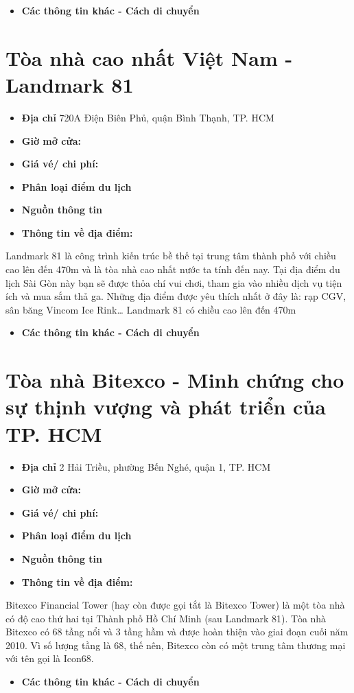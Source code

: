 \documentclass{article}
\begin{document}
\begin{itemize}
    \item{\textbf{Các thông tin khác - Cách di chuyển}}
\end{itemize}

\section{Tòa nhà cao nhất Việt Nam - Landmark 81}
\begin{itemize}
    \item{\textbf{Địa chỉ}} 720A Điện Biên Phủ, quận Bình Thạnh, TP. HCM
    \item{\textbf{Giờ mở cửa:}}
    \item{\textbf{Giá vé/ chi phí:}}
    \item{\textbf{Phân loại điểm du lịch} }
    \item{\textbf{Nguồn thông tin}}
    \item{\textbf{Thông tin về địa điểm:}}
\end{itemize}
Landmark 81 là công trình kiến trúc bề thế tại trung tâm thành phố với chiều cao lên đến 470m và là tòa nhà cao nhất nước ta tính đến nay. Tại địa điểm du lịch Sài Gòn này bạn sẽ được thỏa chí vui chơi, tham gia vào nhiều dịch vụ tiện ích và mua sắm thả ga. Những địa điểm được yêu thích nhất ở đây là: rạp CGV, sân băng Vincom Ice Rink… Landmark 81 có chiều cao lên đến 470m
\begin{itemize}
    \item{\textbf{Các thông tin khác - Cách di chuyển}}
\end{itemize}

\section{Tòa nhà Bitexco - Minh chứng cho sự thịnh vượng và phát triển của TP. HCM}
\begin{itemize}
    \item{\textbf{Địa chỉ}} 2 Hải Triều, phường Bến Nghé, quận 1, TP. HCM
    \item{\textbf{Giờ mở cửa:}}
    \item{\textbf{Giá vé/ chi phí:}}
    \item{\textbf{Phân loại điểm du lịch} }
    \item{\textbf{Nguồn thông tin}}
    \item{\textbf{Thông tin về địa điểm:}}
\end{itemize}
Bitexco Financial Tower (hay còn được gọi tắt là Bitexco Tower) là một tòa nhà có độ cao thứ hai tại Thành phố Hồ Chí Minh (sau Landmark 81). Tòa nhà Bitexco có 68 tầng nổi và 3 tầng hầm và được hoàn thiện vào giai đoạn cuối năm 2010. Vì số lượng tầng là 68, thế nên, Bitexco còn có một trung tâm thương mại với tên gọi là Icon68.
\begin{itemize}
    \item{\textbf{Các thông tin khác - Cách di chuyển}}
\end{itemize}
\end{document}
